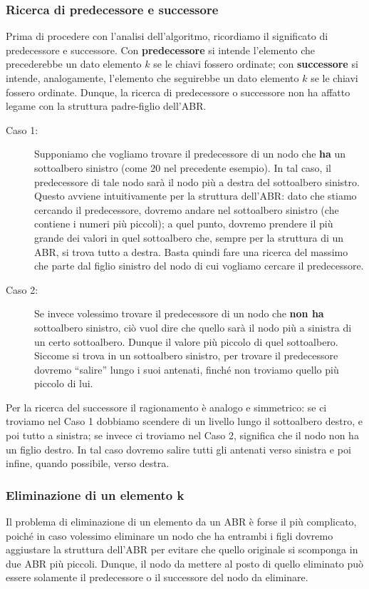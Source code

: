 \documentclass[12pt]{report}
\begin{document}
	\subsubsection*{Ricerca di predecessore e successore}
	Prima di procedere con l'analisi dell'algoritmo, ricordiamo il significato di predecessore e successore. Con \textbf{predecessore} si intende l'elemento che precederebbe un dato elemento $k$ se le chiavi fossero ordinate; con \textbf{successore} si intende, analogamente, l'elemento che seguirebbe un dato elemento $k$ se le chiavi fossero ordinate. Dunque, la ricerca di predecessore o successore non ha affatto legame con la struttura padre-figlio dell'ABR.
	
	\begin{description}
		\item[Caso 1:] Supponiamo che vogliamo trovare il predecessore di un nodo che \textbf{ha} un sottoalbero sinistro (come 20 nel precedente esempio). In tal caso, il predecessore di tale nodo sarà il nodo più a destra del sottoalbero sinistro. Questo avviene intuitivamente per la struttura dell'ABR: dato che stiamo cercando il predecessore, dovremo andare nel sottoalbero sinistro (che contiene i numeri più piccoli); a quel punto, dovremo prendere il più grande dei valori in quel sottoalbero che, sempre per la struttura di un ABR, si trova tutto a destra. Basta quindi fare una ricerca del massimo che parte dal figlio sinistro del nodo di cui vogliamo cercare il predecessore.
		
		\item[Caso 2:] Se invece volessimo trovare il predecessore di un nodo che \textbf{non ha} sottoalbero sinistro, ciò vuol dire che quello sarà il nodo più a sinistra di un certo sottoalbero. Dunque il valore più piccolo di quel sottoalbero. Siccome si trova in un sottoalbero sinistro, per trovare il predecessore dovremo ``salire'' lungo i suoi antenati, finché non troviamo quello più piccolo di lui.
	\end{description}
	
	Per la ricerca del successore il ragionamento è analogo e simmetrico: se ci troviamo nel Caso 1 dobbiamo scendere di un livello lungo il sottoalbero destro, e poi tutto a sinistra; se invece ci troviamo nel Caso 2, significa che il nodo non ha un figlio destro. In tal caso dovremo salire tutti gli antenati verso sinistra e poi infine, quando possibile, verso destra.
	
	\subsubsection*{Eliminazione di un elemento k}
	Il problema di eliminazione di un elemento da un ABR è forse il più complicato, poiché in caso volessimo eliminare un nodo che ha entrambi i figli dovremo aggiustare la struttura dell'ABR per evitare che quello originale si scomponga in due ABR più piccoli.
	Dunque, il nodo da mettere al posto di quello eliminato può essere solamente il predecessore o il successore del nodo da eliminare.
	
\end{document}

